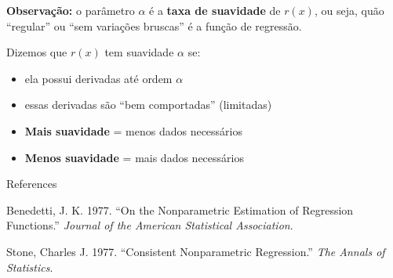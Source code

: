 \documentclass[
  ignorenonframetext,
  aspectratio=169,
]{beamer}
\newlength{\cslhangindent}
\newenvironment{CSLReferences}[2] %
 {\begin{list}{}{%
  \setlength{\itemindent}{0pt}
  \setlength{\leftmargin}{0pt}
  \setlength{\parsep}{0pt}
  \ifodd #1
   \setlength{\leftmargin}{\cslhangindent}
   \setlength{\itemindent}{-1\cslhangindent}
  \fi
  \setlength{\itemsep}{#2\baselineskip}}}
 {\end{list}}
\providecommand{\tightlist}{%
  \setlength{\itemsep}{0pt}\setlength{\parskip}{0pt}}
\begin{document}
\begin{frame}
\textbf{Observação:} o parâmetro \(\alpha\) é a \textbf{taxa de
suavidade} de \(r(x)\), ou seja, quão ``regular'' ou ``sem variações
bruscas'' é a função de regressão.

\begin{tcolorbox}[enhanced jigsaw, colframe=quarto-callout-tip-color-frame, leftrule=.75mm, opacityback=0, colbacktitle=quarto-callout-tip-color!10!white, opacitybacktitle=0.6, left=2mm, colback=white, arc=.35mm, breakable, toprule=.15mm, bottomtitle=1mm, coltitle=black, toptitle=1mm, titlerule=0mm, title=\textcolor{quarto-callout-tip-color}{\faLightbulb}\hspace{0.5em}{Definição (um pouco) mais formal}, rightrule=.15mm, bottomrule=.15mm]

Dizemos que \(r(x)\) tem suavidade \(\alpha\) se:

\begin{itemize}
\tightlist
\item
  ela possui derivadas até ordem \(\alpha\)
\item
  essas derivadas são ``bem comportadas'' (limitadas)
\end{itemize}

\end{tcolorbox}

\begin{itemize}
\tightlist
\item
  \textbf{Mais suavidade} = menos dados necessários\\
\item
  \textbf{Menos suavidade} = mais dados necessários
\end{itemize}
\end{frame}

\begin{frame}{References}
\label{references}
\label{refs}
\begin{CSLReferences}{1}{0}
Benedetti, J. K. 1977. {``On the Nonparametric Estimation of Regression
Functions.''} \emph{Journal of the American Statistical Association}.

Stone, Charles J. 1977. {``Consistent Nonparametric Regression.''}
\emph{The Annals of Statistics}.

\end{CSLReferences}
\end{frame}
\end{document}
